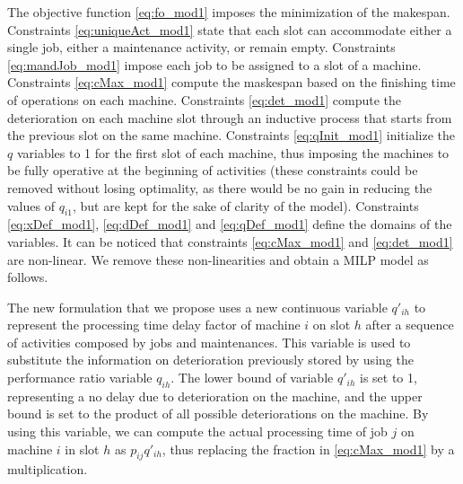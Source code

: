 \documentclass[a4paper,11pt]{article}
\begin{document}
The objective function \eqref{eq:fo_mod1} imposes the minimization of the makespan.  
Constraints \eqref{eq:uniqueAct_mod1} state that each slot can accommodate either a single job, either a maintenance activity, or remain empty. Constraints \eqref{eq:mandJob_mod1} impose each job to be assigned to a slot of a machine. Constraints \eqref{eq:cMax_mod1} compute the maskespan based on the finishing time of operations on each machine. Constraints \eqref{eq:det_mod1} compute the deterioration on each machine slot through an inductive process that starts from the previous slot on the same machine. Constraints \eqref{eq:qInit_mod1} initialize the $q$ variables to 1 for the first slot of each machine, thus imposing the machines to be fully operative at the beginning of activities (these constraints could be removed without losing optimality, as there would be no gain in reducing the values of $q_{i1}$, but are kept for the sake of clarity of the model). Constraints \eqref{eq:xDef_mod1}, \eqref{eq:dDef_mod1} and \eqref{eq:qDef_mod1} define the domains of the variables. It can be noticed that constraints \eqref{eq:cMax_mod1} and \eqref{eq:det_mod1} are non-linear. We remove these non-linearities and obtain a MILP model as follows. 

The new formulation that we propose uses a new continuous variable $q'_{ih}$ to represent the processing time delay factor of machine $i$ on slot $h$ after a sequence of activities composed by jobs and maintenances. This variable is used to substitute the information on deterioration previously stored by using the performance ratio variable $q_{ih}$. The lower bound of variable $q'_{ih}$ is set to 1, representing a no delay due to deterioration on the machine, and the upper bound is set to the product of all possible deteriorations on the machine. By using this variable, we can compute the actual processing time of job $j$ on machine $i$ in slot $h$ as $p_{ij}q'_{ih}$, thus replacing the fraction in \eqref{eq:cMax_mod1} by a multiplication. 
\end{document}
